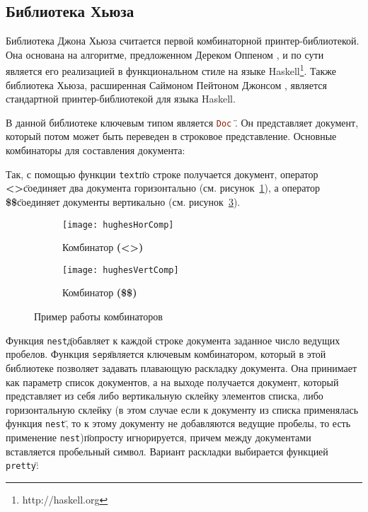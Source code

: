 \subsection{Библиотека Хьюза}

Библиотека Джона Хьюза\cite{hughes} считается первой комбинаторной принтер-библиотекой. Она основана на алгоритме, предложенном Дереком Оппеном \cite{oppen}, и по сути является его реализацией в функциональном стиле на языке Haskell\footnote{http://haskell.org}. Также библиотека Хьюза, расширенная Саймоном Пейтоном Джонсом \cite{peytonJones}, является стандартной принтер-библиотекой для языка Haskell.


В данной библиотеке ключевым типом является \" \lstinline[language=Haskell]{Doc} \". Он представляет документ, который потом может быть переведен в строковое представление.
Основные комбинаторы для составления документа:


Так, с помощью функции \"\lstinline[language=Haskell]{text}\" по строке получается документ, оператор \"\textbf{<>}\" соединяет два документа горизонтально (см. рисунок~\ref{fig:hughesHorComp}), а оператор \"\textbf{\$\$}\" соединяет документы вертикально (см. рисунок~\ref{fig:hughesVertComp}).

\begin{figure}[ht]
	\begin{subfigure}[b]{0.45\linewidth}
		\centering
		\texttt{[image: hughesHorComp]}
		\caption{Комбинатор \textbf{(<>)}}
		\label{fig:hughesHorComp}
	\end{subfigure}
	\hspace{0.5cm}
	\begin{subfigure}[b]{0.45\linewidth}
		\centering
		\texttt{[image: hughesVertComp]}
		\caption{Комбинатор \textbf{(\$\$)}}
		\label{fig:hughesVertComp}
	\end{subfigure}

	\caption{Пример работы комбинаторов}
\end{figure}

Функция \"\lstinline[language=Haskell]{nest}\" добавляет к каждой строке документа заданное число ведущих пробелов. Функция \"\lstinline[language=Haskell]{sep}\" является ключевым комбинатором, который в этой библиотеке позволяет задавать плавающую раскладку документа. Она принимает как параметр список документов, а на выходе получается документ, который представляет из себя либо вертикальную склейку элементов списка, либо горизонтальную склейку (в этом случае если к документу из списка применялась функция \"\lstinline[language=Haskell]{nest}\", то к этому документу не добавляются ведущие пробелы, то есть применение \"\lstinline[language=Haskell]{nest})\" попросту игнорируется, причем между документами вставляется пробельный символ. Вариант раскладки выбирается функцией \"\lstinline[language=Haskell]{pretty}\":


